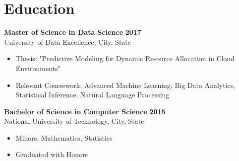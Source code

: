 \documentclass[10pt]{article}
\begin{document}
\section*{Education}
\vspace{-4pt}

\textbf{Master of Science in Data Science} \hfill \textbf{2017} \\
University of Data Excellence, City, State
\begin{itemize}
    \item Thesis: "Predictive Modeling for Dynamic Resource Allocation in Cloud Environments"
    \item Relevant Coursework: Advanced Machine Learning, Big Data Analytics, Statistical Inference, Natural Language Processing
\end{itemize}

\vspace{6pt}

\textbf{Bachelor of Science in Computer Science} \hfill \textbf{2015} \\
National University of Technology, City, State
\begin{itemize}
    \item Minors: Mathematics, Statistics
    \item Graduated with Honors
\end{itemize}

\end{document}
